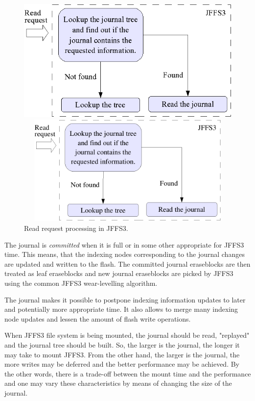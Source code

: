 %
%
\begin{figure}[h]
\begin{center}
\begin{htmlonly}
\includegraphics{pics/journal-02.png}
\end{htmlonly}
\includegraphics[width=120mm,height=55mm]{pics/journal-02.pdf}
\end{center}
\caption{Read request processing in JFFS3.}
\label{ref_FigureJournal_02}
\end{figure}

The journal is \emph{committed} when it is full or in some other appropriate
for JFFS3 time. This means, that the indexing nodes corresponding to the
journal changes are updated and written to the flash. The committed
journal eraseblocks are then treated as leaf eraseblocks and new journal
eraseblocks are picked by JFFS3 using the common JFFS3
\mbox{wear-levelling} algorithm.

The journal makes it possible to postpone indexing information updates to later
and potentially more appropriate time. It also allows to merge many indexing
node updates and lessen the amount of flash write operations.

When JFFS3 file system is being mounted, the journal should be read, "replayed"
and the journal tree should be built. So, the larger is the journal, the longer
it may take to mount JFFS3. From the other hand, the larger is the journal, the
more writes may be deferred and the better performance may be achieved. By the
other words, there is a \mbox{trade-off} between the mount time and the
performance and one may vary these characteristics by means of changing the
size of the journal.

